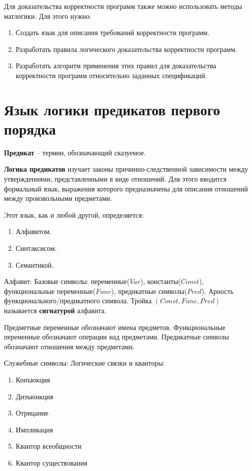 \documentclass[11pt]{article}
\begin{document}
Для доказательства корректности программ также можно использовать методы матлогики. Для этого нужно:
\begin{enumerate}
\item Создать язык для описания требований корректности программ.
\item Разработать правила логического доказательства корректности программ.
\item Разработать алгоритм применения этих правил для доказательства корректности программ относительно заданных спецификаций.
\end{enumerate}

\section{Язык логики предикатов первого порядка}
\label{sec:org568c653}
\textbf{Предикат} -- термин, обозначающий сказуемое.

\textbf{Логика предикатов} изучает законы причинно-следственной зависимости между утверждениями, представленными в виде отношений. Для этого вводится формальный язык, выражения которого предназначены для описания отношений между произвольными предметами.

Этот язык, как и любой другой, определяется:
\begin{enumerate}
\item Алфавитом.
\item Синтаксисом.
\item Семантикой.
\end{enumerate}

Алфавит:
Базовые символы: переменные(\(Var\)), константы(\(Const\)), функциональные переменные(\(Func\)), предикатные символы(\(Pred\)).
Арность функционального/предикатного символа. Тройка \((Const, Func, Pred)\) называется \textbf{сигнатурой} алфавита.

Предметные переменные обозначают имена предметов. Функциональные переменные обозначают операции над предметами. Предикатные символы обозначают отношения между предметами.

Служебные символы:
Логические связки и кванторы:
\begin{enumerate}
\item Конъюкция
\item Дизъюнкция
\item Отрицание
\item Импликация
\item Квантор всеобщности
\item Квантор существования
\end{enumerate}
\end{document}
